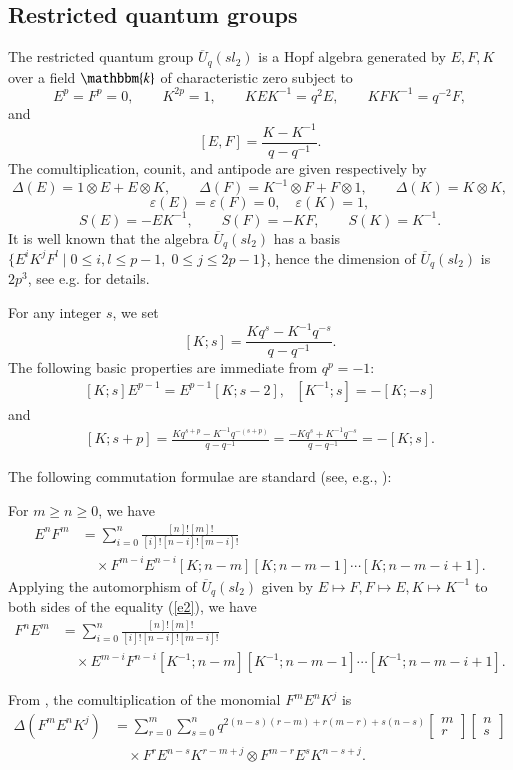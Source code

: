 \documentclass[11pt]{amsart}
\numberwithin{equation}{section}
\begin{document}
\subsection{Restricted quantum groups}

The restricted quantum group $\overline{U}_q(sl_2)$ is a Hopf algebra generated by $E,F,K$ over a field $\mathbbm{k}$ of characteristic zero subject to
\[
E^p=F^p=0,\qquad K^{2p}=1,\qquad KEK^{-1}=q^2E,\qquad KFK^{-1}=q^{-2}F,
\]
and
\[
[E,F]=\frac{K-K^{-1}}{q-q^{-1}}.
\]
The comultiplication, counit, and antipode are given respectively by
\[
\Delta(E)=1\otimes E+E\otimes K,\qquad
\Delta(F)=K^{-1}\otimes F+F\otimes 1,\qquad
\Delta(K)=K\otimes K,
\]
\[
\varepsilon(E)=\varepsilon(F)=0,\quad \varepsilon(K)=1,
\]
\[
S(E)=-EK^{-1},\qquad S(F)=-KF,\qquad S(K)=K^{-1}.
\]
It is well known that the algebra $\overline{U}_q(sl_2)$ has a basis $\{E^iK^jF^l\mid 0\le i,l\le p-1,\;0\le j\le 2p-1\}$, hence the dimension of $\overline{U}_q(sl_2)$ is $2p^3$, see e.g. \cite{FGST} for details.

For any integer $s$, we set
\[
[K;s]=\frac{Kq^s-K^{-1}q^{-s}}{q-q^{-1}}.
\]
The following basic properties are immediate from $q^p=-1$:
\begin{align}\label{e4}[K;s]E^{p-1}=E^{p-1}[K;s-2],\ \ \  [K^{-1};s]=-[K;-s]\end{align}
and
\begin{align}\label{e5}
[K;s+p]=\frac{Kq^{s+p}-K^{-1}q^{-(s+p)}}{q-q^{-1}}
=\frac{-Kq^{s}+K^{-1}q^{-s}}{q-q^{-1}}
=-[K;s].
\end{align}


The following commutation formulae are standard (see, e.g., \cite{KS}):

For $m\geq n\geq0$, we have
\begin{align}\label{e2}E^{n}F^{m}&=\sum_{i=0}^{n}\frac{[n]![m]!}{[i]![n-i]![m-i]!}\\
\nonumber &\quad \times F^{m-i}E^{n-i}[K;n-m][K;n-m-1]\cdots[K;n-m-i+1].
\end{align}
Applying the automorphism of $\overline{U}_q(sl_2)$ given by $E\mapsto F,F\mapsto E,K\mapsto K^{-1}$ to both sides of the equality (\ref{e2}), we have
\begin{align}\label{e3}F^{n}E^{m}&=\sum_{i=0}^{n}\frac{[n]![m]!}{[i]![n-i]![m-i]!}\\
\nonumber &\quad \times E^{m-i}F^{n-i}[K^{-1};n-m][K^{-1};n-m-1]\cdots[K^{-1};n-m-i+1].
\end{align}


From \cite[Eq.(3.1)]{FGST}, the  comultiplication of the monomial $F^m E^n K^j$ is
\[
\begin{aligned}
\Delta(F^m E^n K^j)
&= \sum_{r=0}^m \sum_{s=0}^n 
q^{2(n-s)(r-m)+r(m-r)+s(n-s)}
\begin{bmatrix} m \\ r \end{bmatrix}
\begin{bmatrix} n \\ s \end{bmatrix} \\
&\quad \times F^r E^{n-s} K^{r-m+j} \otimes F^{m-r} E^s K^{n-s+j}. 
\end{aligned}
\]
\end{document}
